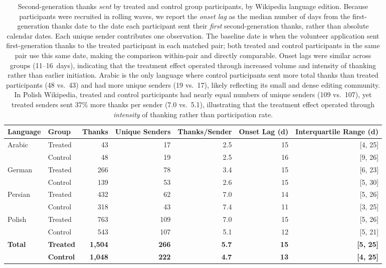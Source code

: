 \documentclass[9pt,twoside,lineno]{pnas-new}
\begin{document}
\clearpage
\begin{table}[ht]
\centering
\small
\caption{Second-generation thanks \emph{sent} by treated and control group participants, by Wikipedia language edition. Because participants were recruited in rolling waves, we report the \emph{onset lag} as the median number of days from the first-generation thanks date to the date each participant sent their \emph{first} second-generation thanks, rather than absolute calendar dates. Each unique sender contributes one observation. The baseline date is when the volunteer application sent first-generation thanks to the treated participant in each matched pair; both treated and control participants in the same pair use this same date, making the comparison within-pair and directly comparable. Onset lags were similar across groups (11--16~days), indicating that the treatment effect operated through increased volume and intensity of thanking rather than earlier initiation. Arabic is the only language where control participants sent more total thanks than treated participants (48 vs.\ 43) and had more unique senders (19 vs.\ 17), likely reflecting its small and dense editing community. In Polish Wikipedia, treated and control participants had nearly equal numbers of unique senders (109 vs.\ 107), yet treated senders sent 37\% more thanks per sender (7.0 vs.\ 5.1), illustrating that the treatment effect operated through \emph{intensity} of thanking rather than participation rate.}
\label{table:second-gen-sent}
\begin{tabular}{ll rrr rr}
\toprule
\textbf{Language} & \textbf{Group} & \textbf{Thanks} & \textbf{Unique Senders} & \textbf{Thanks/Sender} & \textbf{Onset Lag (d)} & \textbf{Interquartile Range (d)} \\
\midrule
Arabic & Treated &  43 & 17 & 2.5 & 15 & [4, 25] \\
       & Control &  48 & 19 & 2.5 & 16 & [9, 26] \\
\addlinespace
German & Treated & 266 & 78 & 3.4 & 15 & [6, 23] \\
       & Control & 139 & 53 & 2.6 & 15 & [5, 30] \\
\addlinespace
Persian & Treated & 432 & 62 & 7.0 & 14 & [5, 26] \\
        & Control & 318 & 43 & 7.4 & 11 & [3, 25] \\
\addlinespace
Polish & Treated & 763 & 109 & 7.0 & 15 & [5, 26] \\
       & Control & 543 & 107 & 5.1 & 12 & [5, 21] \\
\addlinespace
\textbf{Total} & \textbf{Treated} & \textbf{1{,}504} & \textbf{266} & \textbf{5.7} & \textbf{15} & \textbf{[5, 25]} \\
 & \textbf{Control} & \textbf{1{,}048} & \textbf{222} & \textbf{4.7} & \textbf{13} & \textbf{[4, 25]} \\
\bottomrule
\end{tabular}
\end{table}
\end{document}
